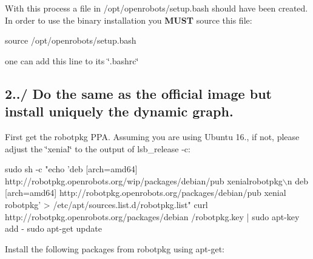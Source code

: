 With this process a file in /opt/openrobots/setup.bash should have been created. In order to use the binary installation you {\bfseries M\+U\+ST} source this file\+: 
\begin{DoxyCode}
source /opt/openrobots/setup.bash
\end{DoxyCode}
 one can add this line to its \char`\"{}.\+bashrc\char`\"{}\hypertarget{subpage_installation_install_subsec_binary}{}\subsection{2../ Do the same as the official image but install uniquely the dynamic graph.}\label{subpage_installation_install_subsec_binary}
First get the robotpkg P\+PA. Assuming you are using Ubuntu 16., if not, please adjust the \char`\"{}xenial\char`\"{} to the output of {\ttfamily lsb\+\_\+release -\/c}\+: 
\begin{DoxyCode}
sudo sh -c \textcolor{stringliteral}{"echo 'deb [arch=amd64] http://robotpkg.openrobots.org/wip/packages/debian/pub xenialrobotpkg\(\backslash\)n
      deb [arch=amd64] http://robotpkg.openrobots.org/packages/debian/pub xenial robotpkg' >
       /etc/apt/sources.list.d/robotpkg.list"}
curl http:\textcolor{comment}{//robotpkg.openrobots.org/packages/debian}
/robotpkg.key | sudo apt-key add -
sudo apt-\textcolor{keyword}{get} update
\end{DoxyCode}


Install the following packages from robotpkg using apt-\/get\+:


